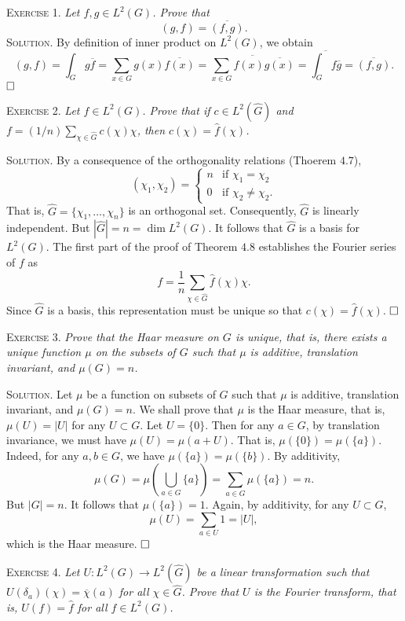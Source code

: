 \documentclass[11pt, leqno]{article}
\newcommand{\done}{\ensuremath{\hfill\square}}
\begin{document}
\textsc{Exercise 1}. \emph{Let $f,g \in L^2(G)$. Prove that 
\begin{displaymath}
(g,f) = \overline{(f,g)}.
\end{displaymath}}\textsc{Solution}. By definition of inner product on $L^2(G)$, we obtain 
\begin{displaymath}
  (g, f) = \int_G g\overline{f} = \sum_{x\in G} g(x) \overline{f(x)} = \overline{\sum_{x\in G} f(x) \overline{g(x)}} = \overline{\int_G f\overline{g}} = \overline{(f,g)}.
\end{displaymath}\done

\textsc{Exercise 2}. \emph{Let $f \in L^2(G)$. Prove that if $c\in L^2(\widehat{G})$ and $f=(1/n)\sum_{\chi \in \widehat{G}} c(\chi) \chi$, then $c(\chi) = \widehat{f}(\chi)$.}

\textsc{Solution}. By a consequence of the orthogonality relations (Thoerem $4.7$), 
\begin{displaymath}
(\chi_1, \chi_2) =
\begin{cases}
  n & \text{if } \chi_1 = \chi_2 \\
  0 & \text{if } \chi_2 \ne \chi_2.
\end{cases}
\end{displaymath}
That is, $\widehat{G} = \{\chi_1, \ldots, \chi_n\}$ is an orthogonal set. Consequently, $\widehat{G}$ is linearly independent. But $|\widehat{G}| = n = \dim L^2(G)$. It follows that $\widehat{G}$ is a basis for $L^2(G)$. The first part of the proof of Theorem $4.8$ establishes the Fourier series of $f$ as 
\begin{displaymath}
f = \frac{1}{n} \sum_{\chi \in \widehat{G}} \widehat{f}(\chi) \chi.
\end{displaymath}
Since $\widehat{G}$ is a basis, this representation must be unique so that $c(\chi) = \widehat{f}(\chi)$. \done

\textsc{Exercise 3}. \emph{Prove that the Haar measure on $G$ is unique, that is, there exists a unique function $\mu$ on the subsets of $G$ such that $\mu$ is additive, translation invariant, and $\mu (G) = n$.}

\textsc{Solution}. Let $\mu$ be a function on subsets of $G$ such that $\mu$ is additive, translation invariant, and $\mu(G) = n$. We shall prove that $\mu$ is the Haar measure, that is, $\mu(U) = |U|$ for any $U \subset G$. Let $U = \{0\}$. Then for any $a \in G$, by translation invariance, we must have $\mu(U) = \mu(a + U)$. That is, $\mu(\{0\}) = \mu(\{a\})$. Indeed, for any $a, b\in G$, we have $\mu(\{a\}) = \mu(\{b\})$. By additivity, 
\begin{displaymath}
\mu(G) = \mu(\bigcup_{a\in G} \{a\}) = \sum_{a\in G} \mu(\{a\}) = n.
\end{displaymath}
But $|G| = n$. It follows that $\mu(\{a\}) = 1$. Again, by additivity, for any $U \subset G$, 
\begin{displaymath}
\mu(U) = \sum_{a\in U} 1 = |U|,
\end{displaymath}
which is the Haar measure. \done

\textsc{Exercise 4}. \emph{Let $U : L^2(G) \to L^2(\widehat{G})$ be a linear transformation such that $U(\delta_a)(\chi) = \overline{\chi}(a)$ for all $\chi \in \widehat{G}$. Prove that $U$ is the Fourier transform, that is, $U(f) = \widehat{f}$ for all $f\in L^2(G)$.}
\end{document}
